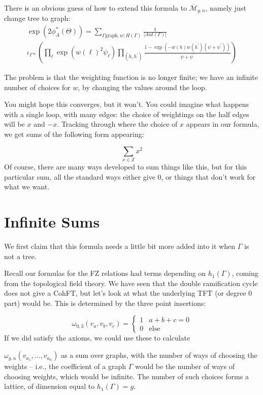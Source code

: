 \documentclass{amsart}
\theoremstyle{definition}
\newcommand{\Z}{\mathbb{Z}}
\newcommand{\Mbar}{\overline{\mathcal{M}}}
\newcommand{\Aut}{Aut}
\begin{document}
There is an obvious guess of how to extend this formula to $\Mbar_{g,n}$, namely just change tree to graph:
 \begin{multline*}
\exp (2\phi_A^*(\Theta))=\sum_{\Gamma \text{graph}, w:H(\Gamma)}\frac{1}{|\Aut(\Gamma)|}\\
 \iota_{\Gamma*}\left( \prod_{\ell} \exp(w(\ell)^2\psi_\ell) \prod_{(h,h^\prime)} \frac{1-\exp(-w(h)w(h^\prime)(\psi+\psi^\prime))}{\psi+\psi^\prime}\right) 
\end{multline*}

The problem is that the weighting function is no longer finite; we have an infinite number of choices for $w$, by changing the values around the loop.

You might hope this converges, but it won't.  You could imagine what happens with a single loop, with many edges: the choice of weightings on the half edges will be $x$ and $-x$.  Tracking through where the choice of $x$ appears in our formula, we get sums of the following form appearing:

$$\sum_{x\in\Z} x^2$$
Of course, there are many ways developed to sum things like this, but for this particular sum, all the standard ways either give 0, or things that don't work for what we want.

\section{Infinite Sums}
We first claim that this formula needs a little bit more added into it when $\Gamma$ is not a tree.

Recall our formulas for the FZ relations had terms depending on $h_1(\Gamma)$, coming from the topological field theory.  We have seen that the double ramification cycle does not give a CohFT, but let's look at what the underlying TFT (or degree 0 part) would be.  This is determined by the three point insertions:

$$\omega_{0,3}(v_a,v_b,v_c)=\left\{\begin{array}{ll} 1 & a+b+c=0 \\ 0 & \text{else}
\end{array}\right.$$
If we did satisfy the axioms, we could use these to calculate

$\omega_{g,n}(v_{a_1},\dots, v_{a_n})$ as a sum over graphs, with the number of ways of choosing the weights -- i.e., the coefficient of a graph $\Gamma$ would be the number of ways of choosing weights, which would be infinite.  The number of such choices forms a lattice, of dimension equal to $h_1(\Gamma)=g$.
\end{document}
